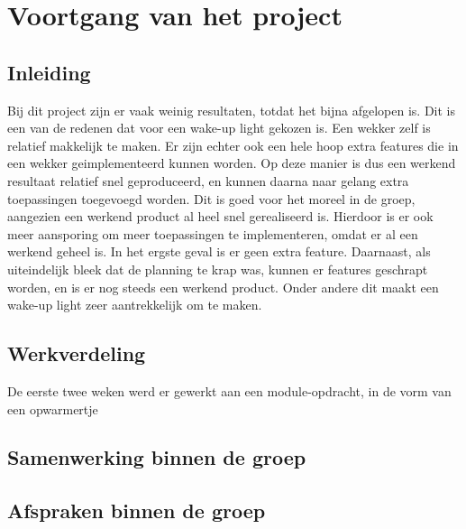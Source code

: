 \chapter{Voortgang van het project}

\section{Inleiding}
Bij dit project zijn er vaak weinig resultaten, totdat het bijna afgelopen is. 
Dit is een van de redenen dat voor een wake-up light gekozen is.
Een wekker zelf is relatief makkelijk te maken. 
Er zijn echter ook een hele hoop extra features die in een wekker geimplementeerd kunnen worden. 
Op deze manier is dus een werkend resultaat relatief snel geproduceerd, en kunnen daarna naar gelang extra toepassingen toegevoegd worden. 
Dit is goed voor het moreel in de groep, aangezien een werkend product al heel snel gerealiseerd is.
Hierdoor is er ook meer aansporing om meer toepassingen te implementeren, omdat er al een werkend geheel is. 
In het ergste geval is er geen extra feature.
Daarnaast, als uiteindelijk bleek dat de planning te krap was, kunnen er features geschrapt worden, en is er nog steeds een werkend product. 
Onder andere dit maakt een wake-up light zeer aantrekkelijk om te maken.

\section{Werkverdeling}
De eerste twee weken werd er gewerkt aan een module-opdracht, in de vorm van een opwarmertje


\section{Samenwerking binnen de groep}

\section{Afspraken binnen de groep}
